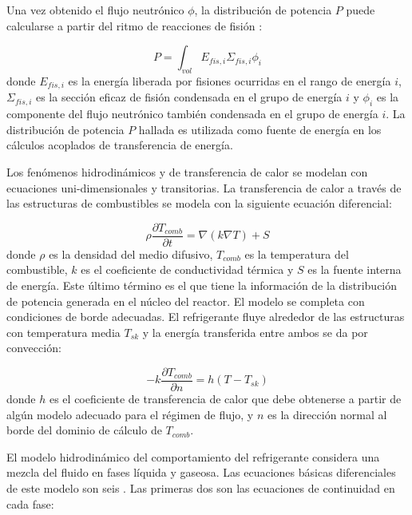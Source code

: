 Una vez obtenido el flujo neutrónico $\phi$,
la distribución de potencia $P$ puede calcularse a partir del ritmo de reacciones de fisión \cite{lamarsh}:

\begin{equation}
P = \int_{vol} E_{fis,i} \Sigma_{fis,i} \phi_{i}
\label{power}
\end{equation}
donde $E_{fis,i}$ es la energía liberada por fisiones ocurridas en el rango de energía $i$,
$\Sigma_{fis,i}$ es la sección eficaz de fisión condensada en el grupo de energía $i$ y
$\phi_{i}$ es la componente del flujo neutrónico también condensada en el grupo de energía $i$.
La distribución de potencia ${P}$ hallada es utilizada como fuente de energía en los cálculos acoplados de transferencia de energía.

Los fenómenos hidrodinámicos y de transferencia de calor se modelan con ecuaciones uni-dimensionales y transitorias.
La transferencia de calor a través de las estructuras de combustibles se modela con la siguiente ecuación diferencial:

\begin{equation}
\rho \frac{\partial T_{comb}}{\partial t} = \nabla \left ( k \nabla T \right )  + S
\label{relap-calor}
\end{equation}
donde $\rho$ es la densidad del medio difusivo,
$T_{comb}$ es la temperatura del combustible,
$k$ es el coeficiente de conductividad térmica y
$S$ es la fuente interna de energía.
Este último término es el que tiene la información de la distribución de potencia generada en el núcleo del reactor.
El modelo se completa con condiciones de borde adecuadas.
El refrigerante fluye alrededor de las estructuras con temperatura media $T_{sk}$ y la energía transferida entre ambos se da por convección:

\begin{equation}
-k \frac{\partial T_{comb}}{\partial n} = h \left ( T - T_{sk} \right )
\label{relap-conveccion}
\end{equation}
donde $h$ es el coeficiente de transferencia de calor que debe obtenerse a partir de algún modelo adecuado para el régimen de flujo,
y $n$ es la dirección normal al borde del dominio de cálculo de $T_{comb}$.

El modelo hidrodinámico del comportamiento del refrigerante considera una mezcla del fluido en fases líquida y gaseosa.
Las ecuaciones básicas diferenciales de este modelo son seis \cite{manual-relap-modelos}.
Las primeras dos son las ecuaciones de continuidad en cada fase:

